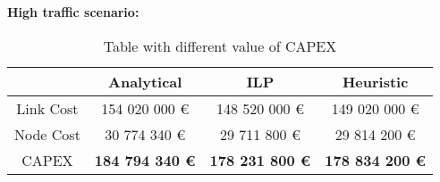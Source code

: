 \vspace{11pt}
\textbf{High traffic scenario:}\\

\begin{table}[h!]
\centering
\begin{tabular}{| c | c | c | c |}
 \hline
   & Analytical & ILP & Heuristic \\
 \hline\hline
 Link Cost & 154 020 000 \euro & 148 520 000 \euro & 149 020 000 \euro \\
 Node Cost & 30 774 340 \euro & 29 711 800 \euro & 29 814 200 \euro \\
 CAPEX & \textbf{184 794 340 \euro} & \textbf{178 231 800 \euro} & \textbf{178 834 200 \euro} \\
 \hline
\end{tabular}
\caption{Table with different value of CAPEX }
\label{table_comparative_opaque_sur_ref_3}
\end{table}

